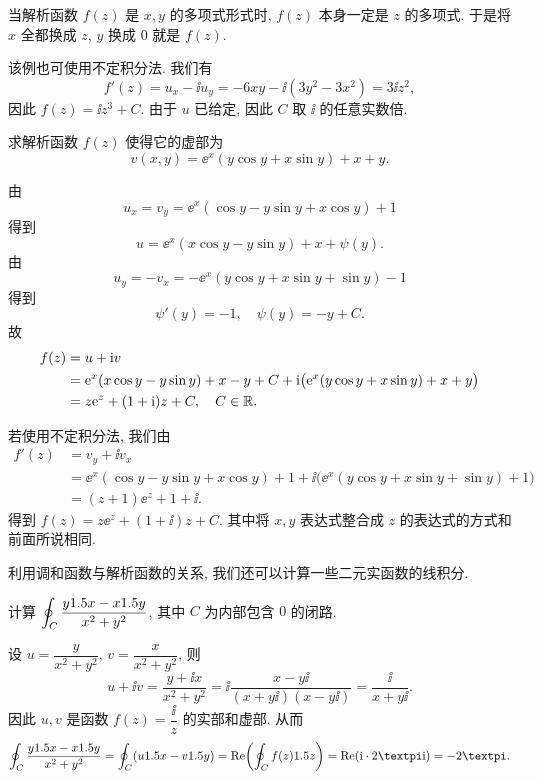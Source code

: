 当解析函数 $f(z)$ 是 $x,y$ 的多项式形式时, $f(z)$ 本身一定是 $z$ 的多项式.
于是将 $x$ 全都换成 $z$, $y$ 换成 $0$ 就是 $f(z)$.

该例也可使用不定积分法.
我们有
\[
  f'(z)=u_x-\ii u_y=-6xy-\ii (3y^2-3x^2)=3\ii z^2,
\]
因此 $f(z)=\ii z^3+C$. 由于 $u$ 已给定, 因此 $C$ 取 $\ii$ 的任意实数倍.

\begin{example}
  求解析函数 $f(z)$ 使得它的虚部为
  \[
    v(x,y)=\ee^x(y\cos y+x\sin y)+x+y.
  \]
\end{example}

\begin{solution}
  由
  \[
    u_x=v_y=\ee^x(\cos y-y\sin y+x\cos y)+1
  \]
  得到
  \[
    u=\ee^x(x\cos y-y\sin y)+x+\psi(y).
  \]
  由
  \[
    u_y=-v_x=-\ee^x(y\cos y+x\sin y+\sin y)-1
  \]
  得到
  \[
    \psi'(y)=-1,\quad\psi(y)=-y+C.
  \]
  故
  \begin{align*}
    f(z)&=u+\mathrm{i} v\\&
    =\mathrm{e}^x(x\cos y-y\sin y)+x-y+C+\mathrm{i}\bigl(\mathrm{e}^x(y\cos y+x\sin y)+x+y\bigr)\\&
    =z\mathrm{e}^z+(1+\mathrm{i})z+C,\quad C\in{\mathbb{R}}.
  \end{align*}
\end{solution}

若使用不定积分法, 我们由
\begin{align*}
    f'(z)&=v_y+\ii v_x\\&
  =\ee^x(\cos y-y\sin y+x\cos y)+1+\ii\bigl(\ee^x(y\cos y+x\sin y+\sin y)+1\bigr)\\&
  =(z+1)\ee^z+1+\ii.
\end{align*}
得到 $f(z)=z\ee^z+(1+\ii)z+C$.
其中将 $x,y$ 表达式整合成 $z$ 的表达式的方式和前面所说相同.

利用调和函数与解析函数的关系, 我们还可以计算一些二元实函数的线积分.

\begin{example}
  计算 $\displaystyle\oint_C \dfrac{y1.5 x-x1.5 y}{x^2+y^2}$, 其中 $C$ 为内部包含 $0$ 的闭路.
\end{example}

\begin{solution}
  设 $u=\dfrac{y}{x^2+y^2}$, $v=\dfrac{x}{x^2+y^2}$, 则
  \[
     u+\ii v
    =\frac{y+\ii x}{x^2+y^2}
    =\ii\frac{x-y\ii}{(x+y\ii)(x-y\ii)}
    =\frac{\ii}{x+y\ii}.
  \]
  因此 $u,v$ 是函数 $f(z)=\dfrac{\ii}{z}$ 的实部和虚部.
  从而
  \[
     \oint_C \dfrac{y\d x-x\d y}{x^2+y^2}
    =\oint_C (u\d x-v\d y)
    =\Re\biggl(\oint_C f(z)\d z\biggr)
    =\Re(\ii\cdot 2\cpi\ii)
    =-2\cpi.
  \]
\end{solution}

